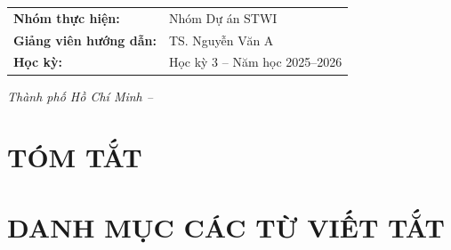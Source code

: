 \documentclass[12pt,a4paper]{report}
\begin{document}
\begin{titlepage}
\vspace{0.8cm}

\begin{center}
\renewcommand{\arraystretch}{1.5}
\fontsize{12}{15}\selectfont
\begin{tabular}{ll}
  \textbf{Nhóm thực hiện:}       & Nhóm Dự án STWI \\
  \textbf{Giảng viên hướng dẫn:} & TS. Nguyễn Văn A \\
  \textbf{Học kỳ:}               & Học kỳ 3 -- Năm học 2025--2026 \\
\end{tabular}
\end{center}

\vfill
{\fontsize{13}{16}\selectfont\itshape Thành phố Hồ Chí Minh -- \the\year}
\vspace{0.4cm}
\restoregeometry
\end{titlepage}

\newpage
\chapter*{TÓM TẮT}


\newpage
\tableofcontents

\newpage
\listoffigures
{}

\newpage
\listoftables
{}

\newpage
\chapter*{DANH MỤC CÁC TỪ VIẾT TẮT}


\newpage


\newpage

\end{document}
